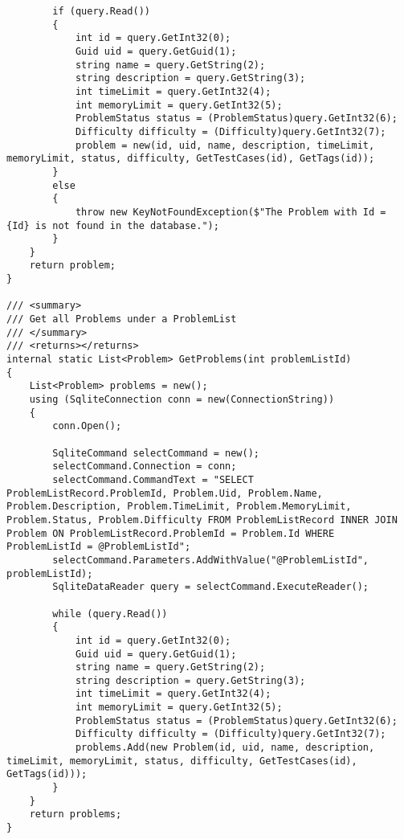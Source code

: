 \documentclass[report.tex]{subfiles}
\begin{document}
\begin{verbatim}
        if (query.Read())
        {
            int id = query.GetInt32(0);
            Guid uid = query.GetGuid(1);
            string name = query.GetString(2);
            string description = query.GetString(3);
            int timeLimit = query.GetInt32(4);
            int memoryLimit = query.GetInt32(5);
            ProblemStatus status = (ProblemStatus)query.GetInt32(6);
            Difficulty difficulty = (Difficulty)query.GetInt32(7);
            problem = new(id, uid, name, description, timeLimit, memoryLimit, status, difficulty, GetTestCases(id), GetTags(id));
        }
        else
        {
            throw new KeyNotFoundException($"The Problem with Id = {Id} is not found in the database.");
        }
    }
    return problem;
}

/// <summary>
/// Get all Problems under a ProblemList
/// </summary>
/// <returns></returns>
internal static List<Problem> GetProblems(int problemListId)
{
    List<Problem> problems = new();
    using (SqliteConnection conn = new(ConnectionString))
    {
        conn.Open();

        SqliteCommand selectCommand = new();
        selectCommand.Connection = conn;
        selectCommand.CommandText = "SELECT ProblemListRecord.ProblemId, Problem.Uid, Problem.Name, Problem.Description, Problem.TimeLimit, Problem.MemoryLimit, Problem.Status, Problem.Difficulty FROM ProblemListRecord INNER JOIN Problem ON ProblemListRecord.ProblemId = Problem.Id WHERE ProblemListId = @ProblemListId";
        selectCommand.Parameters.AddWithValue("@ProblemListId", problemListId);
        SqliteDataReader query = selectCommand.ExecuteReader();

        while (query.Read())
        {
            int id = query.GetInt32(0);
            Guid uid = query.GetGuid(1);
            string name = query.GetString(2);
            string description = query.GetString(3);
            int timeLimit = query.GetInt32(4);
            int memoryLimit = query.GetInt32(5);
            ProblemStatus status = (ProblemStatus)query.GetInt32(6);
            Difficulty difficulty = (Difficulty)query.GetInt32(7);
            problems.Add(new Problem(id, uid, name, description, timeLimit, memoryLimit, status, difficulty, GetTestCases(id), GetTags(id)));
        }
    }
    return problems;
}


\end{verbatim}
\end{document}
